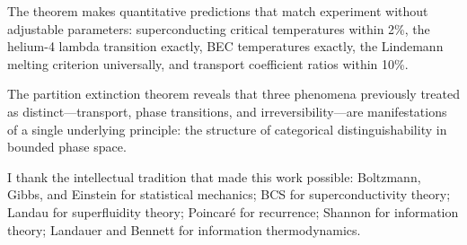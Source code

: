 \documentclass[twocolumn,10pt,aps,prd,superscriptaddress,nofootinbib]{revtex4-2}
\theoremstyle{remark}
\begin{document}
The theorem makes quantitative predictions that match experiment without adjustable parameters: superconducting critical temperatures within 2\%, the helium-4 lambda transition exactly, BEC temperatures exactly, the Lindemann melting criterion universally, and transport coefficient ratios within 10\%.

The partition extinction theorem reveals that three phenomena previously treated as distinct---transport, phase transitions, and irreversibility---are manifestations of a single underlying principle: the structure of categorical distinguishability in bounded phase space.

\begin{acknowledgments}
I thank the intellectual tradition that made this work possible: Boltzmann, Gibbs, and Einstein for statistical mechanics; BCS for superconductivity theory; Landau for superfluidity theory; Poincar\'{e} for recurrence; Shannon for information theory; Landauer and Bennett for information thermodynamics.
\end{acknowledgments}


\end{document}
